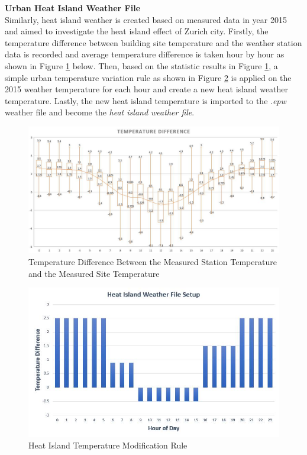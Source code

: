 \documentclass[a4paper, oneside]{discothesis}
\begin{document}
			\textbf{Urban Heat Island Weather File}\\
				Similarly, heat island weather is created based on measured data in year 2015 and aimed to investigate the heat island effect of Zurich city. Firstly, the temperature difference between building site temperature and the weather station data is recorded and average temperature difference is taken hour by hour as shown in Figure \ref{fig:HeatIslandConst} below. Then, based on the statistic results in Figure \ref{fig:HeatIslandConst}, a simple urban temperature variation rule as shown in Figure \ref{fig:HeatIslandRule} is applied on the 2015 weather temperature for each hour and create a new heat island weather temperature. Lastly, the new heat island temperature is imported to the .\textit{epw} weather file and become the \textit{heat island weather file}.


				\begin{figure}[H]
				\centering
				\includegraphics[scale=0.55]{HeatIsland_Construction.jpg}
				\caption{Temperature Difference Between the Measured Station Temperature and the Measured Site Temperature }
				\label{fig:HeatIslandConst}
				\end{figure}
				
				\begin{figure}[H]
				\centering
				\includegraphics[scale=0.62]{HeatIslandConstruction.jpg}
				\caption{Heat Island Temperature Modification Rule}
				\label{fig:HeatIslandRule}
				\end{figure}
				
\end{document}
